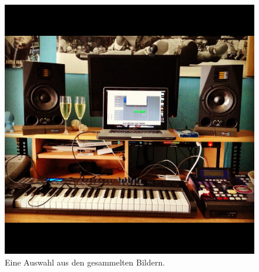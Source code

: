 \begin{figure}
\begin{minipage}{0.24\textwidth}
    \end{minipage}
    \begin{minipage}{0.24\textwidth}
        \centering
        \includegraphics[width=\textwidth]{bilder/recording-255869_1280.jpg}
    \end{minipage}
    \caption{Eine Auswahl aus den gesammelten Bildern.}
    \label{fig:collected_images}
\end{figure}

